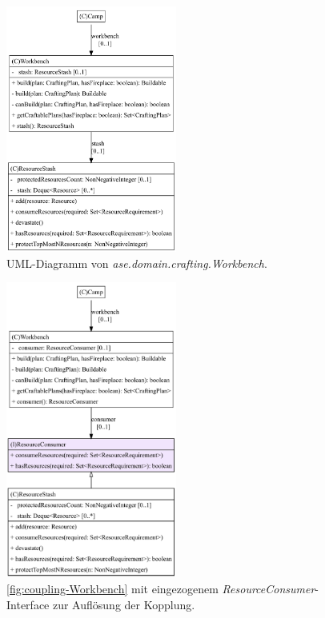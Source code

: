 \begin{figure}[H]
	\centering
	\includegraphics[width=0.5\textwidth]{Bilder/Workbench_structure.pdf} 
	\caption{UML-Diagramm von \textit{ase.domain.crafting.Workbench}.}
	\label{fig:coupling-Workbench}
\end{figure} 

\begin{figure}[H]
	\centering
	\includegraphics[width=0.5\textwidth]{Bilder/Workbench_fixed_structure.pdf} 
	\caption{\autoref{fig:coupling-Workbench} mit eingezogenem \textit{ResourceConsumer}-Interface 
	zur Auflösung der Kopplung.}
	\label{fig:coupling-Workbench-fixed}
\end{figure} 

